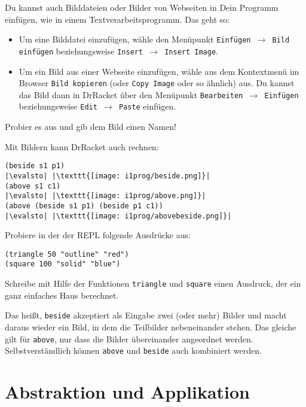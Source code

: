 \begin{aufgabeinline}
  Du kannst auch Bilddateien oder Bilder von Webseiten in Dein Programm
  einfügen, wie in einem Textverarbeitsprogramm. Das geht so:
  \begin{itemize}
    \item Um eine Bilddatei einzufügen, wähle den Menüpunkt
      \texttt{Einfügen $\rightarrow$ Bild einfügen} beziehungsweise
      \texttt{Insert $\rightarrow$ Insert Image}.
    \item Um ein Bild aus einer Webseite einzufügen, wähle aus dem
      Kontextmenü im Browser \texttt{Bild kopieren} (oder \texttt{Copy
      Image} oder so ähnlich) aus.  Du kannst das Bild dann in
    DrRacket über den Menüpunkt \texttt{Bearbeiten $\rightarrow$ Einfügen}
    beziehungsweise \texttt{Edit $\rightarrow$ Paste} einfügen.
  \end{itemize}
  Probier es aus und
  gib dem Bild einen Namen!
\end{aufgabeinline}
%
Mit Bildern kann DrRacket auch rechnen:\label{function:beside-above}
%
\begin{lstlisting}
(beside s1 p1)
|\evalsto| |\texttt{[image: i1prog/beside.png]}|
(above s1 c1)
|\evalsto| |\texttt{[image: i1prog/above.png]}|
(above (beside s1 p1) (beside p1 c1))
|\evalsto| |\texttt{[image: i1prog/abovebeside.png]}|
\end{lstlisting}
%
\begin{aufgabeinline}
  Probiere in der der REPL folgende Ausdrücke aus:
\begin{lstlisting}
(triangle 50 "outline" "red")
(square 100 "solid" "blue")
\end{lstlisting}
  Schreibe mit Hilfe der Funktionen \lstinline{triangle} und
  \lstinline{square} einen Ausdruck, der ein ganz einfaches Haus
  berechnet.
\end{aufgabeinline}
%
Das heißt, \lstinline{beside} akzeptiert als Eingabe zwei (oder mehr)
Bilder und macht daraus wieder ein Bild, in dem die Teilbilder
nebeneinander stehen.  Das gleiche gilt für \lstinline{above}, nur dass
die Bilder übereinander angeordnet werden.  Selbstverständlich können
\lstinline{above} und \lstinline{beside} auch kombiniert werden.

\section{Abstraktion und Applikation}
\label{sec:abstraktion-und-applikation}

